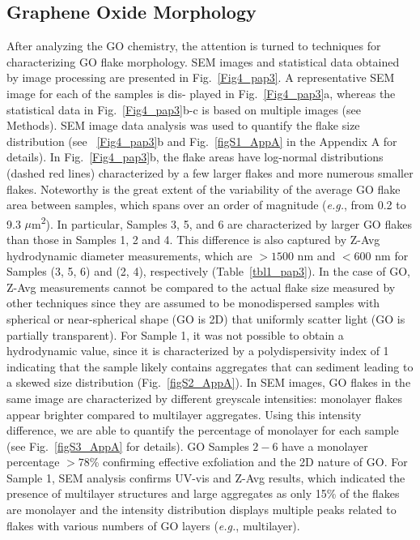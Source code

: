 \subsection{Graphene Oxide Morphology}
After analyzing the GO chemistry, the attention is turned to techniques for characterizing GO flake morphology. SEM images and statistical data obtained by image processing are presented in Fig.~\ref{Fig4_pap3}.
A representative SEM image for each of the samples is dis- played in Fig.~\ref{Fig4_pap3}a, whereas the statistical data in Fig.~\ref{Fig4_pap3}b-c is based on multiple images (see Methods). SEM image data analysis was used to quantify the flake size distribution (see ~\ref{Fig4_pap3}b and Fig.~\ref{figS1_AppA} in the Appendix A for details). In Fig.~\ref{Fig4_pap3}b, the flake areas have log-normal distributions (dashed red lines) characterized by a few larger flakes and more numerous smaller flakes. Noteworthy is the great extent of the variability of the average GO flake area between samples, which spans over an order of magnitude (\textit{e.g.}, from 0.2 to 9.3 $\mu$m\textsuperscript{2}). In particular, Samples 3, 5, and 6 are characterized by larger GO flakes than those in Samples 1, 2 and 4. This difference is also captured by Z-Avg hydrodynamic diameter measurements, which are $>1500$ nm and $<600$ nm for Samples (3, 5, 6) and (2, 4), respectively (Table~\ref{tbl1_pap3}). In the case of GO, Z-Avg measurements cannot be compared to the actual flake size measured by other techniques since they are assumed to be monodispersed samples with spherical or near-spherical shape (GO is 2D) that uniformly scatter light (GO is partially transparent).\cite{xiong2016ultrarobust,zhao2010efficient} For Sample 1, it was not possible to obtain a hydrodynamic value, since it is characterized by a polydispersivity index of 1 indicating that the sample likely contains aggregates that can sediment leading to a skewed size distribution (Fig.~\ref{figS2_AppA}). In SEM images, GO flakes in the same image are characterized by different greyscale intensities: monolayer flakes appear brighter compared to multilayer aggregates. Using this intensity difference, we are able to quantify the percentage of monolayer for each sample (see Fig.~\ref{figS3_AppA} for details).\cite{amadei2016increase} GO Samples $2-6$ have a monolayer percentage $>78$\% confirming effective exfoliation and the 2D nature of GO. For Sample 1, SEM analysis confirms UV-vis and Z-Avg results, which indicated the presence of multilayer structures and large aggregates as only 15\% of the flakes are monolayer and the intensity distribution displays multiple peaks related to flakes with various numbers of GO layers (\textit{e.g.}, multilayer).\\
